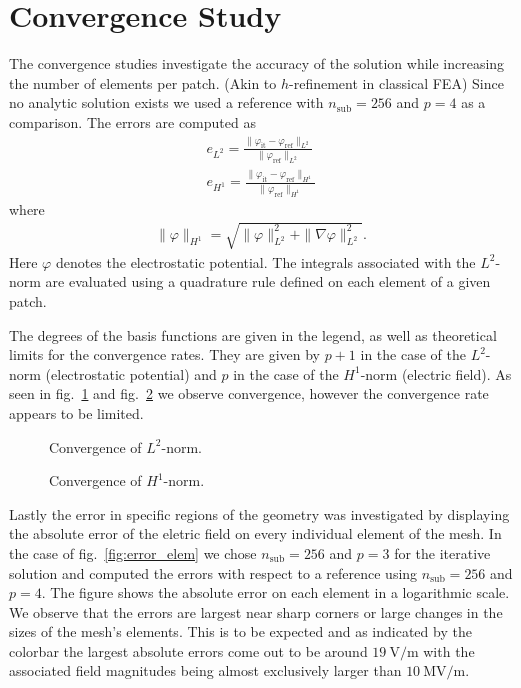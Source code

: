 \section{Convergence Study}
The convergence studies investigate the accuracy of the solution while increasing the number of elements per patch. (Akin to $h$-refinement in classical FEA) Since no analytic solution exists we used a reference with $n_\mathrm{sub}=256$ and $p=4$ as a comparison.
The errors are computed as
\begin{align}
  e_{L^2} = \frac{\| \varphi_\mathrm{it} - \varphi_\mathrm{ref} \|_{L^2}}{\| \varphi_\mathrm{ref} \|_{L^2}}\\
  e_{H^1} = \frac{\| \varphi_\mathrm{it} - \varphi_\mathrm{ref} \|_{H^1}}{\| \varphi_\mathrm{ref} \|_{H^1}}
\end{align}
where
\begin{align}
  \| \varphi \|_{H^1} = \sqrt{ \| \varphi \|_{L^2}^2 + \| \nabla\varphi \|_{L^2}^2 }.
\end{align}
Here $\varphi$ denotes the electrostatic potential. The integrals associated with the $L^2$-norm are evaluated using a quadrature rule defined on each element of a given patch.

The degrees of the basis functions are given in the legend, as well as theoretical limits for the convergence rates. They are given by $p+1$ in the case of the $L^2$-norm (electrostatic potential) and $p$ in the case of the $H^1$-norm (electric field). As seen in fig.~\ref{fig:convergence_potential} and fig.~\ref{fig:convergence_gradient} we observe convergence, however the convergence rate appears to be limited.

\begin{figure}[H]
  \begin{center}
    
    \caption{Convergence of $L^2$-norm.}
    \label{fig:convergence_potential}
  \end{center}
\end{figure}

\begin{figure}[H]
  \begin{center}
    
    \caption{Convergence of $H^1$-norm.}
    \label{fig:convergence_gradient}
  \end{center}
\end{figure}

Lastly the error in specific regions of the geometry was investigated by displaying the absolute error of the eletric field on every individual element of the mesh. In the case of fig.~\ref{fig:error_elem} we chose $n_\mathrm{sub}=256$ and $p=3$ for the iterative solution and computed the errors with respect to a reference using $n_\mathrm{sub}=256$ and $p=4$.
The figure shows the absolute error on each element in a logarithmic scale. We observe that the errors are largest near sharp corners or large changes in the sizes of the mesh's elements. This is to be expected and as indicated by the colorbar the largest absolute errors come out to be around $19\ \mathrm{V/m}$ with the associated field magnitudes being almost exclusively larger than $10\ \mathrm{MV/m}$.

